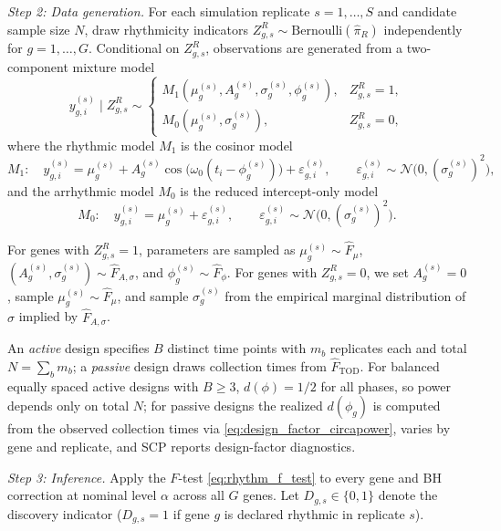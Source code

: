 \documentclass{article}
\begin{document}
\emph{Step 2: Data generation.}
For each simulation replicate $s=1,\ldots,S$ and candidate sample size $N$,
draw rhythmicity indicators $Z_{g,s}^R \sim \mathrm{Bernoulli}(\hat{\pi}_R)$
independently for $g=1,\ldots,G$. Conditional on $Z_{g,s}^R$, observations are
generated from a two-component mixture model
\[
y_{g,i}^{(s)} \mid Z_{g,s}^R \sim
\begin{cases}
M_1\!\left(\mu_g^{(s)}, A_g^{(s)}, \sigma_g^{(s)}, \phi_g^{(s)}\right), & Z_{g,s}^R = 1, \\[6pt]
M_0\!\left(\mu_g^{(s)}, \sigma_g^{(s)}\right), & Z_{g,s}^R = 0,
\end{cases}
\]
where the rhythmic model $M_1$ is the cosinor model
\[
M_1:\quad
y_{g,i}^{(s)} = \mu_g^{(s)} + A_g^{(s)} \cos\!\bigl(\omega_0 (t_i - \phi_g^{(s)})\bigr)
+ \varepsilon_{g,i}^{(s)}, \qquad
\varepsilon_{g,i}^{(s)} \sim \mathcal{N}\bigl(0, (\sigma_g^{(s)})^2\bigr),
\]
and the arrhythmic model $M_0$ is the reduced intercept-only model
\[
M_0:\quad
y_{g,i}^{(s)} = \mu_g^{(s)} + \varepsilon_{g,i}^{(s)}, \qquad
\varepsilon_{g,i}^{(s)} \sim \mathcal{N}\bigl(0, (\sigma_g^{(s)})^2\bigr).
\]

For genes with $Z_{g,s}^R=1$, parameters are sampled as
$\mu_g^{(s)}\sim\hat{F}_\mu$, $(A_g^{(s)},\sigma_g^{(s)})\sim\hat{F}_{A,\sigma}$,
and $\phi_g^{(s)}\sim\hat{F}_\phi$. For genes with $Z_{g,s}^R=0$, we set
$A_g^{(s)}=0$, sample $\mu_g^{(s)}\sim\hat{F}_\mu$, and sample $\sigma_g^{(s)}$
from the empirical marginal distribution of $\sigma$ implied by $\hat{F}_{A,\sigma}$.

An \emph{active} design specifies $B$ distinct time points with $m_b$ replicates
each and total $N=\sum_b m_b$; a \emph{passive} design draws collection times
from $\hat{F}_{\mathrm{TOD}}$. For balanced equally spaced active designs with
$B\geq 3$, $d(\phi)=1/2$ for all phases, so power depends only on total $N$;
for passive designs the realized $d(\phi_g)$ is computed from the observed
collection times via \eqref{eq:design_factor_circapower}, varies by gene and
replicate, and \textsc{SCP} reports design-factor diagnostics. 




\emph{Step 3: Inference.}
Apply the $F$-test \eqref{eq:rhythm_f_test} to every gene and BH correction at
nominal level $\alpha$ across all $G$ genes. Let $D_{g,s}\in\{0,1\}$ denote
the discovery indicator ($D_{g,s}=1$ if gene $g$ is declared rhythmic in
replicate $s$).
\end{document}
